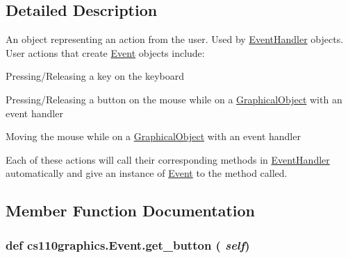 \subsection{Detailed Description}
An object representing an action from the user. Used by \hyperlink{classcs110graphics_1_1EventHandler}{EventHandler} objects. User actions that create \hyperlink{classcs110graphics_1_1Event}{Event} objects include:
\begin{DoxyItemize}
\item Pressing/Releasing a key on the keyboard
\item Pressing/Releasing a button on the mouse while on a \hyperlink{classcs110graphics_1_1GraphicalObject}{GraphicalObject} with an event handler
\item Moving the mouse while on a \hyperlink{classcs110graphics_1_1GraphicalObject}{GraphicalObject} with an event handler
\end{DoxyItemize}

Each of these actions will call their corresponding methods in \hyperlink{classcs110graphics_1_1EventHandler}{EventHandler} automatically and give an instance of \hyperlink{classcs110graphics_1_1Event}{Event} to the method called. 

\subsection{Member Function Documentation}
\hypertarget{classcs110graphics_1_1Event_abdb7a2999936cc7ab1119289f05f8243}{
\subsubsection[{get\_\-button}]{\setlength{\rightskip}{0pt plus 5cm}def cs110graphics.Event.get\_\-button ( {\em self})}}
\label{classcs110graphics_1_1Event_abdb7a2999936cc7ab1119289f05f8243}


